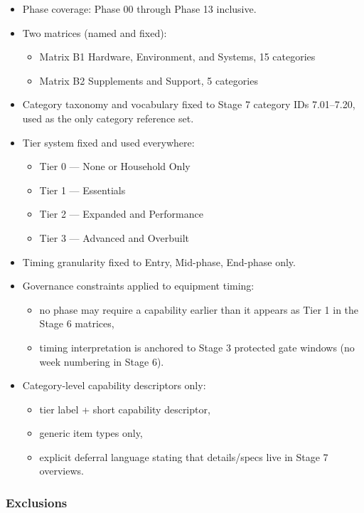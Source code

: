 \documentclass[10pt]{article}
\begin{document}
\begin{itemize}
\item Phase coverage: Phase 00 through Phase 13 inclusive.
\item Two matrices (named and fixed):
  \begin{itemize}
  \item Matrix B1 Hardware, Environment, and Systems, 15 categories
  \item Matrix B2 Supplements and Support, 5 categories
  \end{itemize}
\item Category taxonomy and vocabulary fixed to Stage 7 category IDs 7.01–7.20, used as the only category reference set.
\item Tier system fixed and used everywhere:
  \begin{itemize}
  \item Tier 0 — None or Household Only
  \item Tier 1 — Essentials
  \item Tier 2 — Expanded and Performance
  \item Tier 3 — Advanced and Overbuilt
  \end{itemize}
\item Timing granularity fixed to Entry, Mid-phase, End-phase only.
\item Governance constraints applied to equipment timing:
  \begin{itemize}
  \item no phase may require a capability earlier than it appears as Tier 1 in the Stage 6 matrices,
  \item timing interpretation is anchored to Stage 3 protected gate windows (no week numbering in Stage 6).
  \end{itemize}
\item Category-level capability descriptors only:
  \begin{itemize}
  \item tier label + short capability descriptor,
  \item generic item types only,
  \item explicit deferral language stating that details/specs live in Stage 7 overviews.
  \end{itemize}
\end{itemize}

\subsubsection*{Exclusions}
\end{document}
